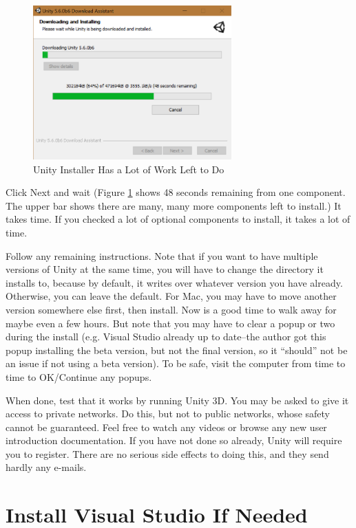 \documentclass[12pt]{amsbook}
\theoremstyle{definition}
\theoremstyle{remark}
\numberwithin{figure}{chapter}
\numberwithin{table}{chapter}
\numberwithin{section}{chapter}
\numberwithin{equation}{section}
\begin{document}
\begin{figure}[h]
  \includegraphics[width=3in]{InstallUnity.png}
  \caption{Unity Installer Has a Lot of Work Left to Do}
  \label{fig:install-unity}
\end{figure}

Click Next and wait (Figure \ref{fig:install-unity} shows 48 seconds remaining from one component.  The upper bar shows there are many, many more components left to install.) It takes time.  If you checked a lot of optional components to install, it takes a lot of time.  

Follow any remaining instructions.  Note that if you want to have multiple versions of Unity at the same time, you will have to change the directory it installs to, because by default, it writes over whatever version you have already.  Otherwise, you can leave the default.  For Mac, you may have to move another version somewhere else first, then install.  Now is a good time to walk away for maybe even a few hours.  But note that you may have to clear a popup or two during the install (e.g. Visual Studio already up to date--the author got this popup installing the beta version, but not the final version, so it ``should'' not be an issue if not using a beta version).  To be safe, visit the computer from time to time to OK/Continue any popups.

When done, test that it works by running Unity 3D.  You may be asked to give it access to private networks.  Do this, but not to public networks, whose safety cannot be guaranteed.  Feel free to watch any videos or browse any new user introduction documentation.  If you have not done so already, Unity will require you to register.  There are no serious side effects to doing this, and they send hardly any e-mails.

\section{Install Visual Studio If Needed}
\end{document}
